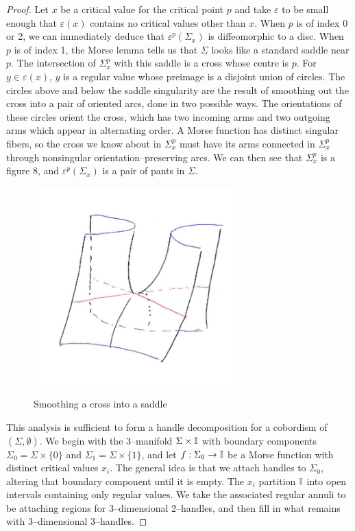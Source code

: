 \begin{proof}
	Let $x$ be a critical value for the critical point $p$ and take $\varepsilon$ to be small enough that $\varepsilon(x)$ contains no critical values other than $x$.
	When $p$ is of index 0 or 2, we can immediately deduce that $\varepsilon^p(\Sigma_x)$ is diffeomorphic to a disc.
	When $p$ is of index 1, the Morse lemma tells us that $\Sigma$ looks like a standard saddle near $p$.
	The intersection of $\Sigma_x^p$ with this saddle is a cross whose centre is $p$.
	For $y\in\varepsilon(x)$, $y$ is a regular value whose preimage is a disjoint union of circles.
	The circles above and below the saddle singularity are the result of smoothing out the cross into a pair of oriented arcs, done in two possible ways.
	The orientations of these circles orient the cross, which has two incoming arms and two outgoing arms which appear in alternating order.
	A Morse function has distinct singular fibers, so the cross we know about in $\Sigma_x^p$ must have its arms connected in $\Sigma_x^p$ through nonsingular orientation--preserving arcs.
	We can then see that $\Sigma_x^p$ is a figure 8, and $\varepsilon^p(\Sigma_x)$ is a pair of pants in $\Sigma$.
	

	\begin{figure}
		\centering
		\caption{Smoothing a cross into a saddle}
		\includegraphics[height=3in]{figures/smoothcross.jpg}
		\label{fig:smoothcross}
	\end{figure}
	
	This analysis is sufficient to form a handle decomposition for a cobordism of $(\Sigma,\emptyset)$.
	We begin with the 3--manifold $\Sigma\times\mathbb{I}$ with boundary components $\Sigma_0=\Sigma\times\{0\}$ and $\Sigma_1=\Sigma\times\{1\}$, and let $f:\Sigma_0\to\mathbb{I}$ be a Morse function with distinct critical values $x_i$.
	The general idea is that we attach handles to $\Sigma_0$, altering that boundary component until it is empty.
	The $x_i$ partition $\mathbb{I}$ into open intervals containing only regular values.
	We take the associated regular annuli to be attaching regions for 3--dimensional 2--handles, and then fill in what remains with 3--dimensional 3--handles.
	

\end{proof}
